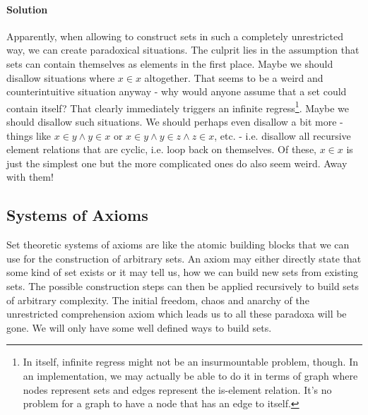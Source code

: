 \paragraph{Solution} Apparently, when allowing to construct sets in such a completely unrestricted way, we can create paradoxical situations. The culprit lies in the assumption that sets can contain themselves as elements in the first place. Maybe we should disallow situations where $x \in x$ altogether. That seems to be a weird and counterintuitive situation anyway - why would anyone assume that a set could contain itself? That clearly immediately triggers an infinite regress\footnote{In itself, infinite regress might not be an insurmountable problem, though. In an implementation, we may actually be able to do it in terms of graph where nodes represent sets and edges represent the is-element relation. It's no problem for a graph to have a node that has an edge to itself.}. Maybe we should disallow such situations. We should perhaps even disallow a bit more - things like $x \in y \wedge y \in x$ or $x \in y \wedge y \in z \wedge z \in x$, etc. - i.e. disallow all recursive element relations that are cyclic, i.e. loop back on themselves. Of these, $x \in x$ is just the simplest one but the more complicated ones do also seem weird. Away with them!






\subsection{Systems of Axioms}
Set theoretic systems of axioms are like the atomic building blocks that we can use for the construction of arbitrary sets. An axiom may either directly state that some kind of set exists or it may tell us, how we can build new sets from existing sets. The possible construction steps can then be applied recursively to build sets of arbitrary complexity. The initial freedom, chaos and anarchy of the unrestricted comprehension axiom which leads us to all these paradoxa will be gone. We will only have some well defined ways to build sets.

